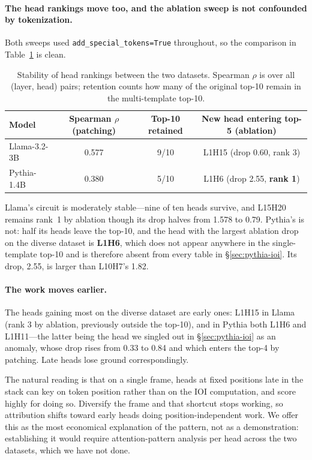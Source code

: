 \documentclass[11pt,a4paper]{article}
\begin{document}
\paragraph{The head rankings move too, and the ablation sweep is not confounded by
tokenization.} Both sweeps used \texttt{add\_special\_tokens=True} throughout, so the
comparison in Table~\ref{tab:rankmove} is clean.

\begin{table}[H]
  \centering
  \caption{Stability of head rankings between the two datasets. Spearman $\rho$ is over
    all (layer, head) pairs; retention counts how many of the original top-10 remain in
    the multi-template top-10.}
  \label{tab:rankmove}
  \smallskip
  \footnotesize\setlength{\tabcolsep}{4pt}
  \begin{tabular}{lccc}
    \toprule
    Model & Spearman $\rho$ (patching) & Top-10 retained & New head entering top-5 (ablation) \\
    \midrule
    Llama-3.2-3B & 0.577 & 9/10 & L1H15 (drop 0.60, rank 3) \\
    Pythia-1.4B  & 0.380 & 5/10 & L1H6 (drop 2.55, \textbf{rank 1}) \\
    \bottomrule
  \end{tabular}
\end{table}

Llama's circuit is moderately stable---nine of ten heads survive, and L15H20 remains
rank~1 by ablation though its drop halves from 1.578 to 0.79. Pythia's is not: half its
heads leave the top-10, and the head with the largest ablation drop on the diverse dataset
is \textbf{L1H6}, which does not appear anywhere in the single-template top-10 and is
therefore absent from every table in \S\ref{sec:pythia-ioi}. Its drop, 2.55, is larger
than L10H7's 1.82.

\paragraph{The work moves earlier.} The heads gaining most on the diverse dataset are
early ones: L1H15 in Llama (rank 3 by ablation, previously outside the top-10), and in
Pythia both L1H6 and L1H11---the latter being the head we singled out in
\S\ref{sec:pythia-ioi} as an anomaly, whose drop rises from 0.33 to 0.84 and which enters
the top-4 by patching. Late heads lose ground correspondingly.

The natural reading is that on a single frame, heads at fixed positions late in the stack
can key on token position rather than on the IOI computation, and score highly for doing
so. Diversify the frame and that shortcut stops working, so attribution shifts toward
early heads doing position-independent work. We offer this as the most economical
explanation of the pattern, not as a demonstration: establishing it would require
attention-pattern analysis per head across the two datasets, which we have not done.
\end{document}
